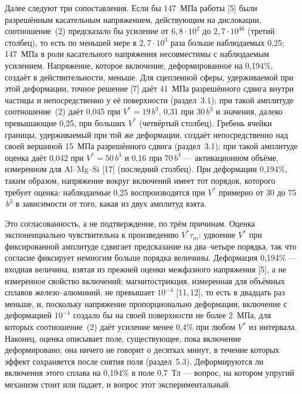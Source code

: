 Далее следуют три сопоставления. Если бы 147~МПа работы [5] были
разрешённым касательным напряжением, действующим на дислокации,
соотношение~(2) предсказало бы усиление от $6{,}8\cdot10^{2}$ до
$2{,}7\cdot10^{46}$ (третий столбец), то есть по меньшей мере в
$2{,}7\cdot10^{3}$ раза больше наблюдаемых 0{,}25; 147~МПа в роли
касательного напряжения несовместимы с наблюдаемым усилением. Напряжение,
которое включение, деформированное на 0{,}194\%, создаёт в действительности,
меньше. Для сцепленной сферы, удерживаемой при этой деформации, точное
решение [7] даёт 41~МПа разрешённого сдвига внутри частицы и непосредственно у её поверхности
(раздел~3.1); при такой амплитуде соотношение~(2) даёт 0{,}045 при
$V^{*} = 19\,b^{3}$, 0{,}31 при $30\,b^{3}$ и значения, далеко превышающие
0{,}25, при больших $V^{*}$ (четвёртый столбец). Гребень ячейки границы,
удерживаемый при той же деформации, создаёт непосредственно над своей
вершиной 15~МПа разрешённого сдвига (раздел~3.1); при такой
амплитуде оценка даёт 0{,}042 при $V^{*} = 50\,b^{3}$ и
0{,}16 при $70\,b^{3}$ --- активационном объёме, измеренном для
Al--Mg--Si [17] (последний столбец). При деформации 0{,}194\%, таким
образом, напряжение вокруг включений имеет тот порядок, которого требует
оценка: наблюдаемые 0{,}25 воспроизводятся при $V^{*}$ примерно от
30 до 75$\,b^{3}$ в зависимости от того, какая из двух
амплитуд взята.

Это согласованность, а не подтверждение, по трём причинам. Оценка
экспоненциально чувствительна к произведению $V^{*}\tau_m$: удвоение $V^{*}$
при фиксированной амплитуде сдвигает предсказание на два--четыре порядка,
так что согласие фиксирует немногим больше порядка величины. Деформация
0{,}194\% --- входная величина, взятая из прежней оценки межфазного
напряжения [5], а не измеренное свойство включений; магнитострикция,
измеренная для объёмных сплавов железо--алюминий, не превышает $10^{-4}$
[11,\,12], то есть в двадцать раз меньше, и, поскольку напряжение
пропорционально деформации, включение с деформацией $10^{-4}$ создало бы на
своей поверхности не более 2~МПа, для которых соотношение~(2) даёт усиление
менее 0{,}4\% при любом $V^{*}$ из интервала. Наконец, оценка описывает
поле, существующее, пока включение деформировано; она ничего не говорит о
десятках минут, в течение которых эффект сохраняется после снятия поля
(раздел~5.3). Деформируются ли включения этого сплава на 0{,}194\% в поле
0{,}7~Тл --- вопрос, на котором упругий механизм стоит или падает, и вопрос
этот экспериментальный.

